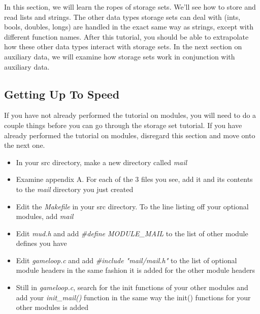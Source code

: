 \documentclass[12pt]{article}
\begin{document}
In this section, we will learn the ropes of storage sets. We'll see how to store and read lists and strings. The other data types storage sets can deal with (ints, bools, doubles, longs) are handled in the exact same way as strings, except with different function names. After this tutorial, you should be able to extrapolate how these other data types interact with storage sets. In the next section on auxiliary data, we will examine how storage sets work in conjunction with auxiliary data.



\subsection{Getting Up To Speed}
If you have not already performed the tutorial on modules, you will need to do a couple things before you can go through the storage set tutorial. If you have already performed the tutorial on modules, disregard this section and move onto the next one.

\begin{itemize}
\item In your src directory, make a new directory called {\it mail}
\item Examine appendix A. For each of the 3 files you see, add it and its contents to the {\it mail} directory you just created
\item Edit the {\it Makefile} in your src directory. To the line listing off your optional modules, add {\it mail}
\item Edit {\it mud.h} and add {\it \#define MODULE\_MAIL} to the list of other module defines you have
\item Edit {\it gameloop.c} and add {\it \#include "mail/mail.h"} to the list of optional module headers in the same fashion it is added for the other module headers
\item Still in {\it gameloop.c}, search for the init functions of your other modules and add your {\it init\_mail()} function in the same way the init() functions for your other modules is added
\end{itemize}
 


\end{document}

